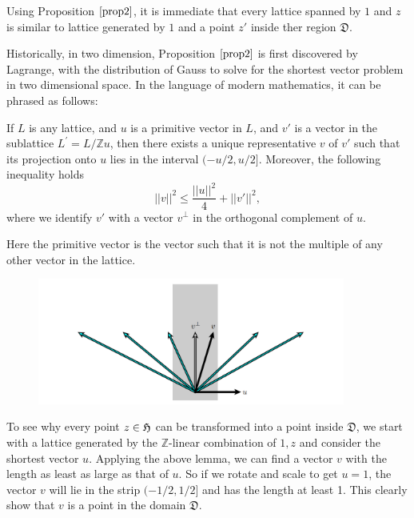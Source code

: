 Using Proposition $\ref{prop2}$, it is immediate that every lattice spanned by $1$ and $z$
is similar to lattice generated by $1$ and a point $z'$ inside ther region $\mathfrak{D}$.

Historically, in two dimension, Proposition $\ref{prop2}$ is first discovered by Lagrange, with the distribution
of Gauss to solve for the shortest vector problem in two dimensional space. In the language of modern mathematics,
it can be phrased as follows:
\begin{prop}
  If $L$ is any lattice, and $u$ is a primitive vector in $L$, and $v'$ is a vector in the sublattice
  $L^\prime = L/\mathbb{Z}u$, then there exists a unique representative $v$ of $v'$ such that its projection onto $u$ lies in the interval
  $(-u/2,u/2]$. Moreover, the following inequality holds
  \[||v||^2 \le \dfrac{||u||^2}{4}+||v'||^2,\]
  where we identify $v'$ with a vector $v^\perp$ in the orthogonal complement of $u$.
\end{prop}
\begin{remark}
  Here the primitive vector is the vector such that it is not the multiple of any other vector in the lattice.
\end{remark}
\begin{figure}[hbt!]
  \includegraphics[width=0.9\textwidth]{Shortest vector.png}
  \caption{}
\end{figure}

To see why every point $z \in \operatorname{\mathfrak{H}}$ can be transformed into a point inside $\mathfrak{D}$,
we start with a lattice generated by the $\mathbb{Z}$-linear combination of $1,z$ and
consider the shortest vector $u$. Applying the above lemma, we can find a vector $v$ with the length as least
as large as that of $u$. So if we rotate and scale to get $u=1$, the vector $v$ will lie
in the strip $(-1/2,1/2]$ and has the length at least 1. This clearly show that $v$ is a point in the domain
$\mathfrak{D}$.


